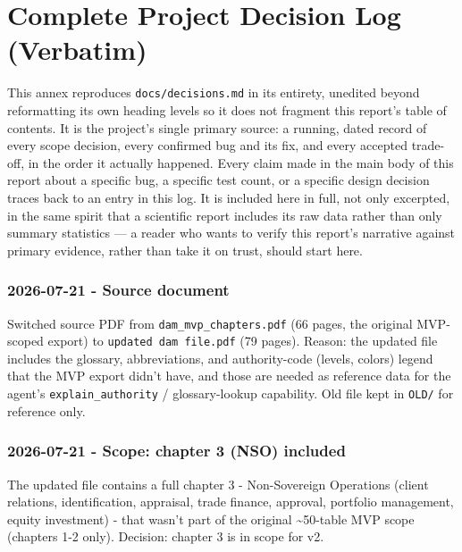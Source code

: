 \chapter{Complete Project Decision Log (Verbatim)}
\label{ch:complete-project-decision-log-verbatim}
This annex reproduces \texttt{docs/\allowbreak{}decisions.md} in its entirety, unedited beyond reformatting its own heading levels so it does not fragment this report's table of contents. It is the project's single primary source: a running, dated record of every scope decision, every confirmed bug and its fix, and every accepted trade-off, in the order it actually happened. Every claim made in the main body of this report about a specific bug, a specific test count, or a specific design decision traces back to an entry in this log. It is included here in full, not only excerpted, in the same spirit that a scientific report includes its raw data rather than only summary statistics — a reader who wants to verify this report's narrative against primary evidence, rather than take it on trust, should start here.

\subsection*{2026-07-21 - Source document}
Switched source PDF from \texttt{dam\_\allowbreak{}mvp\_\allowbreak{}chapters.pdf} (66 pages, the original MVP-scoped export) to \texttt{updated dam file.pdf} (79 pages). Reason: the updated file includes the glossary, abbreviations, and authority-code (levels, colors) legend that the MVP export didn't have, and those are needed as reference data for the agent's \texttt{explain\_\allowbreak{}authority} / glossary-lookup capability. Old file kept in \texttt{OLD/\allowbreak{}} for reference only.

\subsection*{2026-07-21 - Scope: chapter 3 (NSO) included}
The updated file contains a full chapter 3 - Non-Sovereign Operations (client relations, identification, appraisal, trade finance, approval, portfolio management, equity investment) - that wasn't part of the original \textasciitilde{}50-table MVP scope (chapters 1-2 only). Decision: chapter 3 is in scope for v2.

